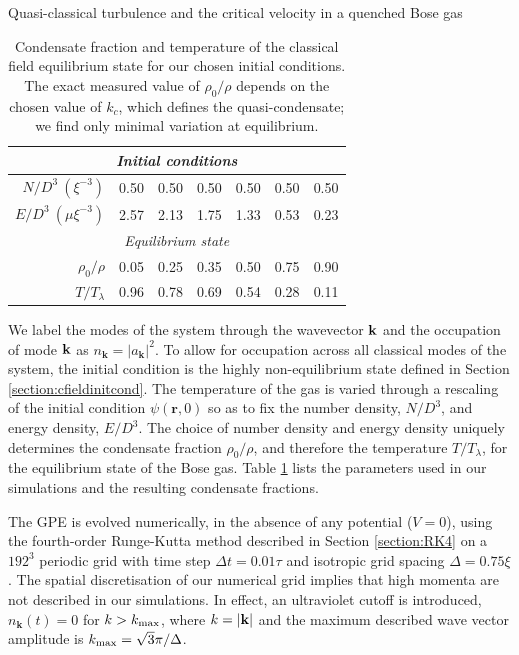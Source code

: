 \begin{chapter}{\label{cha:nonequib}Quasi-classical turbulence and the critical velocity in a quenched Bose gas}
\begin{table}
\centering
\begin{tabular}{rcccccc}
\multicolumn{7}{c}{\it Initial conditions} \\
\hline
\rule{0pt}{3ex}$N/D^3~(\xi^{-3})$           & 0.50 & 0.50 & 0.50 & 0.50 & 0.50 & 0.50 \\
$E/D^3~(\mu \xi^{-3})$  & 2.57 & 2.13 & 1.75 & 1.33 & 0.53 & 0.23 \\
\multicolumn{7}{c}{\it Equilibrium state} \\
\hline
\rule{0pt}{3ex}$\rho_0/\rho$        & 0.05 & 0.25 & 0.35 & 0.50 & 0.75 & 0.90 \\
$T/T_\lambda$        & 0.96 & 0.78 & 0.69 & 0.54 & 0.28 & 0.11
\end{tabular}
\caption{Condensate fraction and temperature of the classical field equilibrium state for our chosen initial conditions. The exact measured value of $\rho_0/\rho$ depends on the chosen value of $k_c$, which defines the quasi-condensate; we find only minimal variation at equilibrium.}
\label{tbl:cond_frac}
\end{table}

We label the modes of the system through the wavevector ${\bf k}$ and the occupation of mode ${\bf k}$ as $n_{\mathbf{k}}=|a_{\mathbf{k}}|^2$. To allow for occupation across all classical modes of the system, the initial condition is the highly non-equilibrium state defined in Section \ref{section:cfieldinitcond}.  The temperature of the gas is varied through a rescaling of the initial condition $\psi(\mathbf{r},0)$ so as to fix the number density, $N/D^3$, and energy density, $E/D^3$. The choice of number density and energy density uniquely determines the condensate fraction $\rho_0/\rho$, and therefore the temperature $T/T_\lambda$, for the equilibrium state of the Bose gas. Table \ref{tbl:cond_frac} lists the parameters used in our simulations and the resulting condensate fractions.

The GPE is evolved numerically, in the absence of any potential ($V = 0$), using the fourth-order Runge-Kutta method described in Section \ref{section:RK4} on a $192^3$ periodic grid with time step $\Delta t =0.01 \tau$ and isotropic grid spacing $\Delta =0.75\xi$. The spatial discretisation of our numerical grid implies that high momenta are not described in our simulations. In effect, an ultraviolet cutoff is introduced, $n_{\mathbf{k}}(t)=0$ for $k>k_{\rm{max}}$, where $k=|{\bf k}|$ and the maximum described wave vector amplitude is $k_{\rm{max}} = \sqrt{3} \pi / \Delta$. 


\end{chapter}
